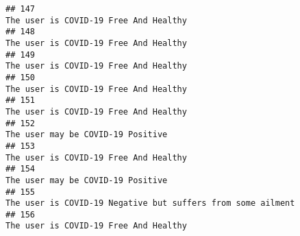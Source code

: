 \documentclass[
]{article}
\begin{document}
\begin{verbatim}
## 147                                                                                                                                                                                                                              The user is COVID-19 Free And Healthy
## 148                                                                                                                                                                                                                              The user is COVID-19 Free And Healthy
## 149                                                                                                                                                                                                                              The user is COVID-19 Free And Healthy
## 150                                                                                                                                                                                                                              The user is COVID-19 Free And Healthy
## 151                                                                                                                                                                                                                              The user is COVID-19 Free And Healthy
## 152                                                                                                                                                                                                                                  The user may be COVID-19 Positive
## 153                                                                                                                                                                                                                              The user is COVID-19 Free And Healthy
## 154                                                                                                                                                                                                                                  The user may be COVID-19 Positive
## 155                                                                                                                                                                                                        The user is COVID-19 Negative but suffers from some ailment
## 156                                                                                                                                                                                                                              The user is COVID-19 Free And Healthy

\end{verbatim}
\end{document}

